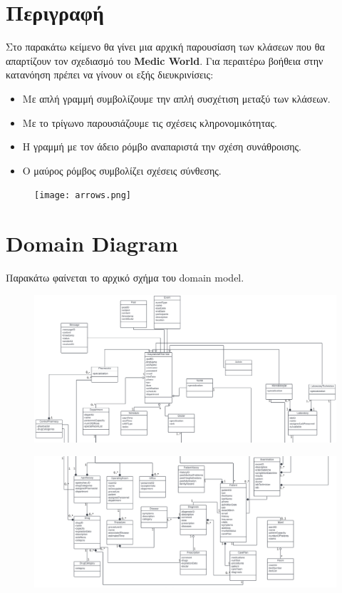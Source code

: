 \documentclass{article}
\begin{document}
\section{Περιγραφή}
Στο παρακάτω κείμενο θα γίνει μια αρχική παρουσίαση των κλάσεων που θα απαρτίζουν τον σχεδιασμό του \textbf{Medic World}. Για περαιτέρω βοήθεια στην κατανόηση πρέπει να γίνουν οι εξής διευκρινίσεις:
\begin{itemize}
    \item Με απλή γραμμή συμβολίζουμε την απλή συσχέτιση μεταξύ των κλάσεων.
    \item Με το τρίγωνο παρουσιάζουμε τις σχέσεις κληρονομικότητας.
    \item Η γραμμή με τον άδειο ρόμβο αναπαριστά την σχέση συνάθροισης.
    \item Ο μαύρος ρόμβος συμβολίζει σχέσεις σύνθεσης.
\end{itemize}

\begin{figure}[!htb]
        \centering
        \texttt{[image: arrows.png]}
\end{figure}
\newpage
\section{Domain Diagram}
Παρακάτω φαίνεται το αρχικό σχήμα του domain model.


\begin{figure}[!htb]
        \centering
        \includegraphics[width=1\textwidth]{domain1.png}
\end{figure}
        
\begin{figure}[!htb]
        \centering
        \includegraphics[width=1\textwidth]{domain2.png}
\end{figure}
        
\end{document}
